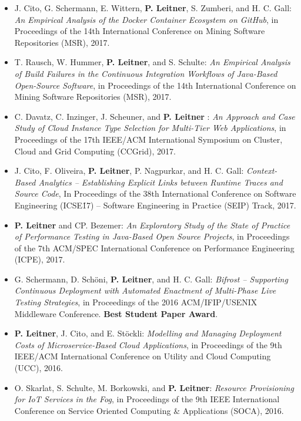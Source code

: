 \documentclass[paper=letter,fontsize=11pt]{scrartcl} %
\begin{document}
\begin{itemize}
	\item J. Cito, G. Schermann, E. Wittern, \textbf{P. Leitner}, S. Zumberi, and H. C. Gall: \emph{An Empirical Analysis of the Docker Container Ecosystem on GitHub}, in Proceedings of the 14th International Conference on Mining Software Repositories (MSR), 2017. 
	\item T. Rausch, W. Hummer, \textbf{P. Leitner}, and S. Schulte: \emph{An Empirical Analysis of Build Failures in the Continuous Integration Workflows of Java-Based Open-Source Software}, in Proceedings of the 14th International Conference on Mining Software Repositories (MSR), 2017. 
	\item C. Davatz, C. Inzinger, J. Scheuner, and \textbf{P. Leitner} : \emph{An Approach and Case Study of Cloud Instance Type Selection for Multi-Tier Web Applications}, in Proceedings of the 17th IEEE/ACM International Symposium on Cluster, Cloud and Grid Computing (CCGrid), 2017. 
	\item J. Cito, F. Oliveira, \textbf{P. Leitner}, P. Nagpurkar, and H. C. Gall: \emph{Context-Based Analytics – Establishing Explicit Links between Runtime Traces and Source Code}, In Proceedings of the 38th International Conference on Software Engineering (ICSE\'17) -- Software Engineering in Practice (SEIP) Track, 2017. 
        \item \textbf{P. Leitner} and CP. Bezemer: \emph{An Exploratory Study of the State of Practice of Performance Testing in Java-Based Open Source Projects}, in  Proceedings of the 7th ACM/SPEC International Conference on Performance Engineering (ICPE), 2017. 
	\item G. Schermann, D. Sch\"oni, \textbf{P. Leitner}, and H. C. Gall: \emph{Bifrost -- Supporting Continuous Deployment with Automated Enactment of Multi-Phase Live Testing Strategies}, in Proceedings of the 2016 ACM/IFIP/USENIX Middleware Conference. \textbf{Best Student Paper Award}. 
	\item \textbf{P. Leitner}, J. Cito, and E. St\"ockli: \emph{Modelling and Managing Deployment Costs of Microservice-Based Cloud Applications}, in Proceedings of the 9th IEEE/ACM International Conference on Utility and Cloud Computing (UCC), 2016. 
  \item O. Skarlat, S. Schulte, M. Borkowski, and \textbf{P. Leitner}: \emph{Resource Provisioning for IoT Services in the Fog}, in Proceedings of the 9th IEEE International Conference on Service Oriented Computing \& Applications (SOCA), 2016. 

\end{itemize}
\end{document}
